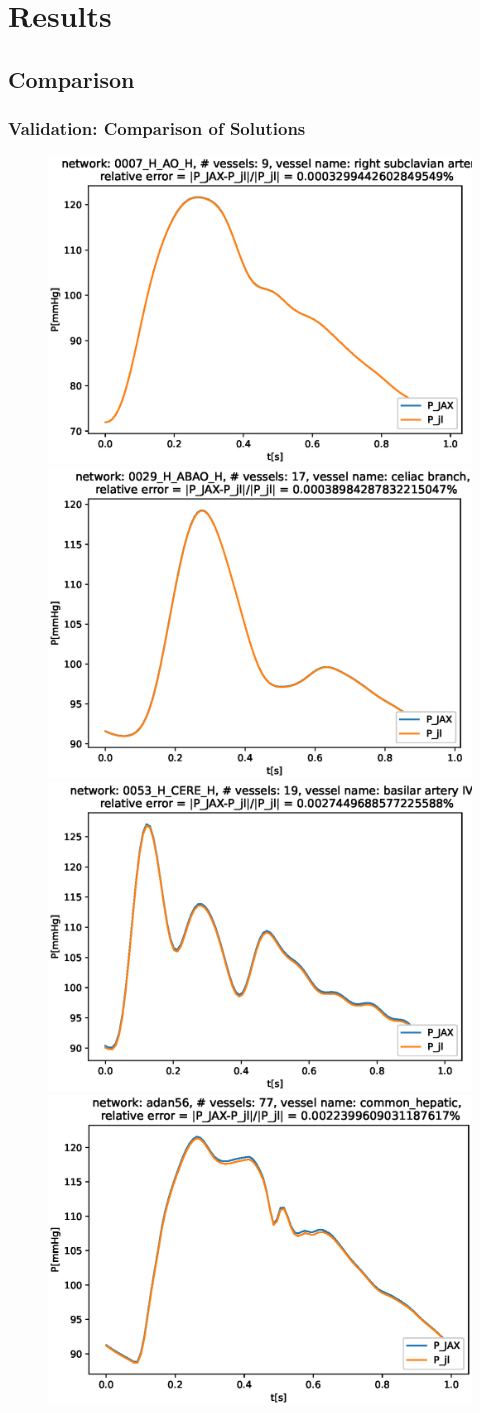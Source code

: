 \documentclass[compress]{beamer}
\begin{document}
\section{Results}
\subsection{Comparison}
\begin{frame}
	\frametitle{Validation: Comparison of Solutions}
	\begin{figure} [H]
		\centering
		\includegraphics[width=0.46\columnwidth]{../figures/0007_H_AO_H_right_subclavian_artery_P.eps}
		\includegraphics[width=0.46\columnwidth]{../figures/0029_H_ABAO_H_celiac_branch_P.eps
		}
		\includegraphics[width=0.46\columnwidth]{../figures/0053_H_CERE_H_basilar_artery_IV_P.eps}
		\includegraphics[width=0.46\columnwidth]{../figures/adan56_common_hepatic_P.eps}
		\label{fig:val}
	\end{figure}
\end{frame}
\end{document}
